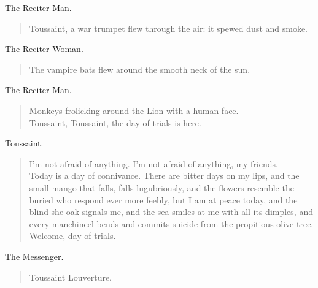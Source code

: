 \documentclass[letterpaper,article,12pt,oneside,notitlepage]{memoir}
\begin{document}
\begin{center}The Reciter Man.\end{center}

\begin{verse}
\indent Toussaint, a war trumpet flew through the air: it spewed dust and smoke. \\
\end{verse}

\begin{center}The Reciter Woman.\end{center}

\begin{verse}
\hspace{1cm} The vampire bats flew around the smooth neck of the sun. \\
\end{verse}

\begin{center}The Reciter Man.\end{center}

\begin{verse}
Monkeys frolicking around the Lion with a human face. \\
Toussaint, Toussaint, the day of trials is here. \\
\end{verse}

\begin{center}Toussaint.\end{center}

\begin{verse}
I'm not afraid of anything. I'm not afraid of anything, my friends. \\
Today is a day of connivance. There are bitter days on my lips, and the small mango that falls, falls lugubriously, and the flowers resemble the buried who respond ever more feebly, but I am at peace today, and the blind she-oak signals me, and the sea smiles at me with all its dimples, and every manchineel bends and commits suicide from the propitious olive tree. \\
\hspace{1cm} Welcome, day of trials. \\
\end{verse}

\begin{center}The Messenger.\end{center}

\begin{verse}
Toussaint Louverture. \\
\end{verse}
\end{document}
